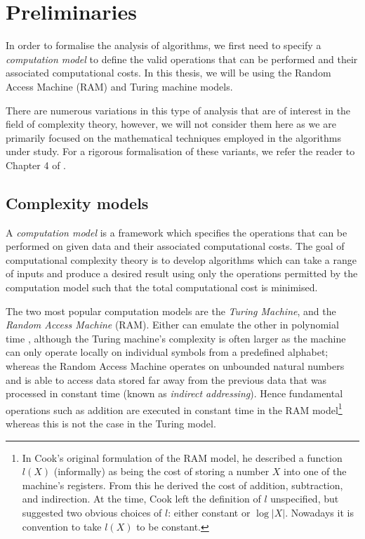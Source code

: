 \chapter{Preliminaries}\label{chp:preliminaries}

In order to formalise the analysis of algorithms, we first need to specify a \emph{computation model} to define the valid operations that can be performed and their associated computational costs. In this thesis, we will be using the Random Access Machine (RAM) and Turing machine models.

There are numerous variations in this type of analysis that are of interest in the field of complexity theory, however, we will not consider them here as we are primarily focused on the mathematical techniques employed in the algorithms under study. For a rigorous formalisation of these variants, we refer the reader to Chapter 4 of \cite{burgisser}.

\section{Complexity models}%
\label{sec:Complexity models}

A \textit{computation model} is a framework which specifies the operations that can be performed on given data and their associated computational costs. The goal of computational complexity theory is to develop algorithms which can take a range of inputs and produce a desired result using only the operations permitted by the computation model such that the total computational cost is minimised.

The two most popular computation models are the \textit{Turing Machine}, and the \textit{Random Access Machine} (RAM). Either can emulate the other in polynomial time \cite{ram-model}, although the Turing machine's complexity is often larger as the machine can only operate locally on individual symbols from a predefined alphabet; whereas the Random Access Machine operates on unbounded natural numbers and is able to access data stored far away from the previous data that was processed in constant time (known as \textit{indirect addressing}). Hence fundamental operations such as addition are executed in constant time in the RAM model\footnote{In Cook's original formulation of the RAM model, he described a function $l(X)$ (informally) as being the cost of storing a number $X$ into one of the machine's registers. From this he derived the cost of addition, subtraction, and indirection. At the time, Cook left the definition of $l$ unspecified, but suggested two obvious choices of $l$: either constant or $\log |X|$. Nowadays it is convention to take $l(X)$ to be constant.} whereas this is not the case in the Turing model.

